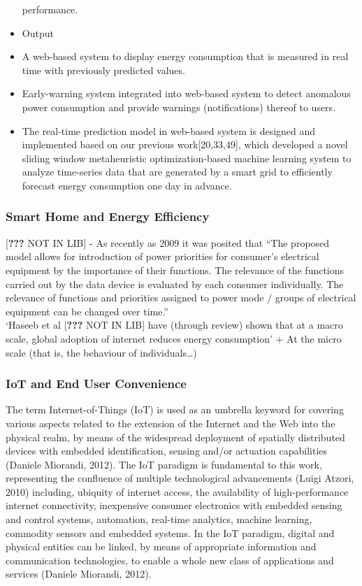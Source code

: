 \documentclass[11pt,]{article}
\begin{document}
\begin{itemize}
  performance.
\item
  Output
\item
  A web-based system to display energy consumption that is measured in
  real time with previously predicted values.
\item
  Early-warning system integrated into web-based system to detect
  anomalous power consumption and provide warnings (notifications)
  thereof to users.
\item
  The real-time prediction model in web-based system is designed and
  implemented based on our previous work{[}20,33,49{]}, which developed
  a novel sliding window metaheuristic optimization-based machine
  learning system to analyze time-series data that are generated by a
  smart grid to efficiently forecast energy consumption one day in
  advance.
\end{itemize}

\hypertarget{smart-home-and-energy-efficiency}{%
\subsubsection{Smart Home and Energy
Efficiency}\label{smart-home-and-energy-efficiency}}

{[}{\textbf{???}} NOT IN LIB{]} - As recently as 2009 it was posited
that ``The proposed model allows for introduction of power priorities
for consumer's electrical equipment by the importance of their
functions. The relevance of the functions carried out by the data device
is evaluated by each consumer individually. The relevance of functions
and priorities assigned to power mode / groups of electrical equipment
can be changed over time.''\\
`Haseeb et al {[}{\textbf{???}} NOT IN LIB{]} have (through review)
shown that at a macro scale, global adoption of internet reduces energy
consumption' + At the micro scale (that is, the behaviour of
individuals\ldots)

\hypertarget{iot-and-end-user-convenience}{%
\subsubsection{IoT and End User
Convenience}\label{iot-and-end-user-convenience}}

The term Internet-of-Things (IoT) is used as an umbrella keyword for
covering various aspects related to the extension of the Internet and
the Web into the physical realm, by means of the widespread deployment
of spatially distributed devices with embedded identification, sensing
and/or actuation capabilities (Daniele Miorandi, 2012). The IoT paradigm
is fundamental to this work, representing the confluence of multiple
technological advancements (Luigi Atzori, 2010) including, ubiquity of
internet access, the availability of high-performance internet
connectivity, inexpensive consumer electronics with embedded sensing and
control systems, automation, real-time analytics, machine learning,
commodity sensors and embedded systems. In the IoT paradigm, digital and
physical entities can be linked, by means of appropriate information and
communication technologies, to enable a whole new class of applications
and services (Daniele Miorandi, 2012).
\end{document}
